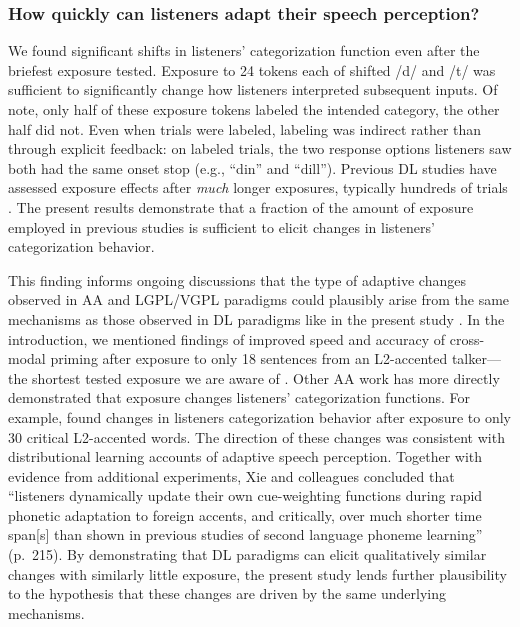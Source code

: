 \documentclass[
  11pt,
  man,mask,floatsintext]{apa6}
\begin{document}
\subsubsection{How quickly can listeners adapt their speech perception?}\label{how-quickly-can-listeners-adapt-their-speech-perception}

We found significant shifts in listeners' categorization function even after the briefest exposure tested. Exposure to 24 tokens each of shifted /d/ and /t/ was sufficient to significantly change how listeners interpreted subsequent inputs. Of note, only half of these exposure tokens labeled the intended category, the other half did not. Even when trials were labeled, labeling was indirect rather than through explicit feedback: on labeled trials, the two response options listeners saw both had the same onset stop (e.g., ``din'' and ``dill''). Previous DL studies have assessed exposure effects after \emph{much} longer exposures, typically hundreds of trials \autocites[e.g., 192 trials in][]{harmon2019}[200 in][]{idemaru-holt2011}[222 in][]{clayards2008,kleinschmidt-jaeger2016}[236 in][]{theodore-monto2019}[456 in][]{nixon2016}. The present results demonstrate that a fraction of the amount of exposure employed in previous studies is sufficient to elicit changes in listeners' categorization behavior.

This finding informs ongoing discussions that the type of adaptive changes observed in AA and LGPL/VGPL paradigms could plausibly arise from the same mechanisms as those observed in DL paradigms like in the present study \autocite{bradlow-bent2008,baese-berk2018,zheng-samuel2020,xie2023}. In the introduction, we mentioned findings of improved speed and accuracy of cross-modal priming after exposure to only 18 sentences from an L2-accented talker---the shortest tested exposure we are aware of \autocite{clarke-garrett2004,xie2018}. Other AA work has more directly demonstrated that exposure changes listeners' categorization functions. For example, \textcite{xie2017} found changes in listeners categorization behavior after exposure to only 30 critical L2-accented words. The direction of these changes was consistent with distributional learning accounts of adaptive speech perception. Together with evidence from additional experiments, Xie and colleagues concluded that ``listeners dynamically update their own cue-weighting functions during rapid phonetic adaptation to foreign accents, and critically, over much shorter time span{[}s{]} than shown in previous studies of second language phoneme learning'' (p.~215). By demonstrating that DL paradigms can elicit qualitatively similar changes with similarly little exposure, the present study lends further plausibility to the hypothesis that these changes are driven by the same underlying mechanisms.
\end{document}
